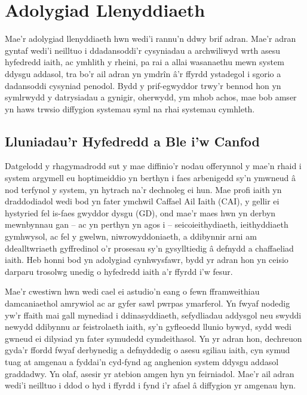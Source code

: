 \chapter{Adolygiad Llenyddiaeth}

Mae'r adolygiad llenyddiaeth hwn wedi'i rannu'n ddwy brif adran. Mae'r adran gyntaf wedi'i neilltuo i ddadansoddi'r cysyniadau a archwiliwyd wrth asesu hyfedredd iaith, ac ymhlith y rheini, pa rai a allai wasanaethu mewn system ddysgu addasol, tra bo'r ail adran yn ymdrîn â'r ffyrdd ystadegol i sgorio a dadansoddi cysyniad penodol. Bydd y prif-egwyddor trwy'r bennod hon yn symlrwydd y datrysiadau a gynigir, oherwydd, ym mhob achos, mae bob amser yn haws trwsio diffygion systemau syml na rhai systemau cymhleth.

\section{Lluniadau'r Hyfedredd a Ble i'w Canfod}

Datgelodd y rhagymadrodd sut y mae diffinio'r nodau offerynnol y mae'n rhaid i system argymell eu hoptimeiddio yn berthyn i faes arbenigedd sy'n ymwneud â nod terfynol y system, yn hytrach na'r dechnoleg ei hun. Mae profi iaith yn draddodiadol wedi bod yn fater ymchwil Caffael Ail Iaith (CAI), y gellir ei hystyried fel is-faes gwyddor dysgu (GD), ond mae'r maes hwn yn derbyn mewnbynnau gan – ac yn perthyn yn agos i – seicoieithydiaeth, ieithyddiaeth gymhwysol, ac fel y gwelwn, niwrowyddoniaeth, a ddibynnir arni am ddealltwriaeth gyffredinol o'r prosesau sy'n gysylltiedig â defnydd a chaffaeliad iaith. Heb honni bod yn adolygiad cynhwysfawr, bydd yr adran hon yn ceisio darparu trosolwg unedig o hyfedredd iaith a'r ffyrdd i'w fesur.

Mae'r cwestiwn hwn wedi cael ei astudio'n eang o fewn fframweithiau damcaniaethol amrywiol ac ar gyfer sawl pwrpas ymarferol. Yn fwyaf nodedig yw'r ffaith mai gall mynediad i ddinasyddiaeth, sefydliadau addysgol neu swyddi newydd ddibynnu ar feistrolaeth iaith, sy'n gyfleoedd llunio bywyd, sydd wedi gwneud ei dilysiad yn fater symudedd cymdeithasol. Yn yr adran hon, dechreuon gyda'r ffordd fwyaf derbynedig a defnyddedig o asesu sgiliau iaith, cyn symud tuag at amgenau a fyddai'n cyd-fynd ag anghenion system ddysgu addasol graddadwy. Yn olaf, asesir yr atebion amgen hyn yn feirniadol. Mae'r ail adran wedi'i neilltuo i ddod o hyd i ffyrdd i fynd i'r afael â diffygion yr amgenau hyn.

